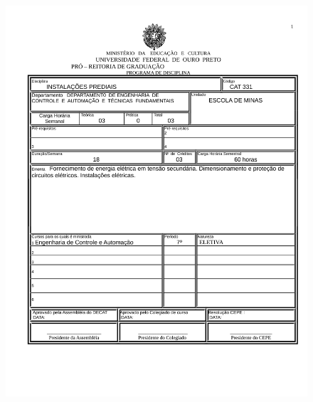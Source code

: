 \begin{figure}[p]
	\centering 
	\includegraphics[scale=0.7]{capitulos/anexo1-programas-disciplina/eg35.pdf}
\end{figure}

